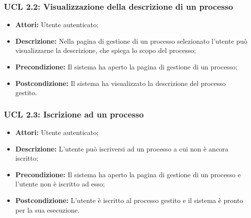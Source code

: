 \hypertarget{L2.2}{}
\subsubsection{UCL 2.2: Visualizzazione della descrizione di un processo}
\begin{itemize}
\item \textbf{Attori:} Utente autenticato;
\item \textbf{Descrizione:} Nella pagina di gestione di un processo selezionato l'utente può visualizzarne la descrizione, che spiega lo scopo del processo;
\item \textbf{Precondizione:} Il sistema ha aperto la pagina di gestione di un processo;
\item \textbf{Postcondizione:} Il sistema ha visualizzato la descrizione del processo gestito.
\end{itemize}

\hypertarget{L2.3}{}
\subsubsection{UCL 2.3: Iscrizione ad un processo}
\begin{itemize}
\item \textbf{Attori:} Utente autenticato;
\item \textbf{Descrizione:} L'utente può iscriversi ad un processo a cui non è ancora iscritto;
\item \textbf{Precondizione:} Il sistema ha aperto la pagina di gestione di un processo e l'utente non è iscritto ad esso;
\item \textbf{Postcondizione:} L'utente è iscritto al processo gestito e il sistema è pronto per la sua esecuzione.
\end{itemize}

\hypertarget{L2.4}{}
